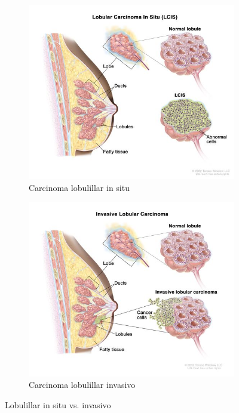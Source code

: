 \documentclass[a4paper,10pt]{book}
\begin{document}
\begin{figure}[h]
    \centering
    \begin{subfigure}[c]{0.48\textwidth}
        \centering
        \includegraphics[width=\textwidth]{reports/assets/lcis.jpg}
        \caption{Carcinoma lobulillar in situ}
        \label{fig:lcis}
    \end{subfigure}
    \begin{subfigure}[c]{0.48\textwidth}
        \centering
        \includegraphics[width=\textwidth]{reports/assets/ilc.jpg}
        \caption{Carcinoma lobulillar invasivo}
        \label{fig:ilc}
    \end{subfigure}
    \caption{Lobulillar in situ vs. invasivo \cite{noauthor_nci_2011}}
    \label{fig:histological_types_two}
\end{figure}
\end{document}
